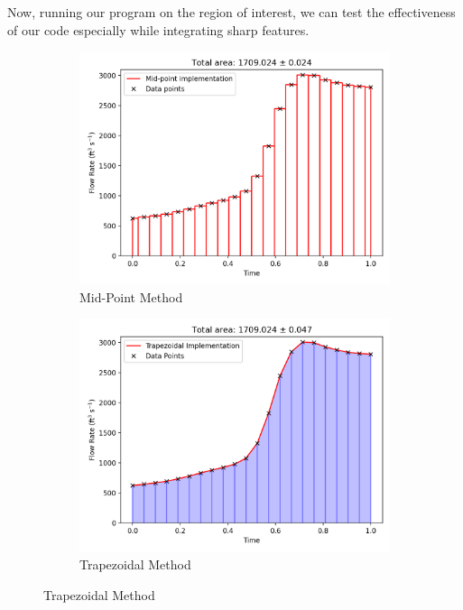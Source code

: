Now, running our program on the region of interest, we can test the effectiveness of our code especially while integrating sharp features.

\begin{figure}[H]
     \centering
     \begin{subfigure}[b]{0.45\textwidth}
         \centering
         \includegraphics[width=\textwidth]{Figures/2/mid-point.png}
         \caption{Mid-Point Method}
     \end{subfigure}
     \begin{subfigure}[b]{0.45\textwidth}
         \centering
         \includegraphics[width=\textwidth]{Figures/2/trapezoidal.png}
         \caption{Trapezoidal Method}
     \end{subfigure}

\end{figure}
